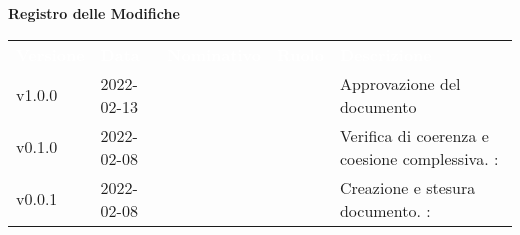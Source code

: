 

{\LARGE{\textbf{Registro delle Modifiche}}} \\
\begin{table}[!htbp]
\renewcommand{\arraystretch}{1.5}
\begin{tabular}{ m{}<{\centering}  m{}<{\centering}  m{}<{\centering}  m{}<{\centering}  m{}<{\centering} }
	\rowcolor{darkblue}
	\textcolor{white}{\textbf{Versione}} &\textcolor{white}{\textbf{Data}}& \textcolor{white}{\textbf{Nominativo}} & \textcolor{white}{\textbf{Ruolo}}&\textcolor{white}{\textbf{Descrizione}}\\ 

	v1.0.0 & 2022-02-13 & \EP & \RE & Approvazione del documento \\

	v0.1.0& 2022-02-08 & \GC & \VE & Verifica di coerenza e coesione complessiva. \VE: \textit{\PV}\\

	v0.0.1& 2022-02-08& \GC &\AN & Creazione e stesura documento. \VE: \textit{\PV}\\

\end{tabular}
\end{table}

\pagebreak